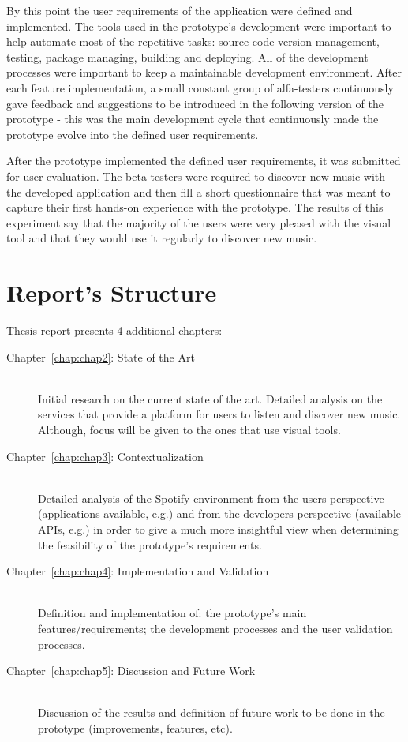   By this point the user requirements of the application were defined and implemented.
  The tools used in the prototype's development were important to help automate most of the repetitive tasks: source code version management, testing, package managing, building and deploying.
  All of the development processes were important to keep a maintainable development environment.
  After each feature implementation, a small constant group of alfa-testers continuously gave feedback and suggestions to be introduced in the following version of the prototype - this was the main development cycle that continuously made the prototype evolve into the defined user requirements.

  After the prototype implemented the defined user requirements, it was submitted for user evaluation.
  The beta-testers were required to discover new music with the developed application and then fill a short questionnaire that was meant to capture their first hands-on experience with the prototype.
  The results of this experiment say that the majority of the users were very pleased with the visual tool and that they would use it regularly to discover new music.


\section{Report's Structure}
\label{sec:structure}
  
  Thesis report presents 4 additional chapters:

  \begin{description}
    \item[Chapter~\ref{chap:chap2}: State of the Art] \hfill \\
      Initial research on the current state of the art.
      Detailed analysis on the services that provide a platform for users to listen and discover new music.
      Although, focus will be given to the ones that use visual tools.
    \item[Chapter~\ref{chap:chap3}: Contextualization] \hfill \\
      Detailed analysis of the Spotify environment from the users perspective (applications available, e.g.) and from the developers perspective (available APIs, e.g.) in order to give a much more insightful view when determining the feasibility of the prototype's requirements.
    \item[Chapter~\ref{chap:chap4}: Implementation and Validation] \hfill \\
      Definition and implementation of: the prototype's main features/requirements; the development processes and the user validation processes.
    \item[Chapter~\ref{chap:chap5}: Discussion and Future Work] \hfill \\
      Discussion of the results and definition of future work to be done in the prototype (improvements, features, etc).
  \end{description}

